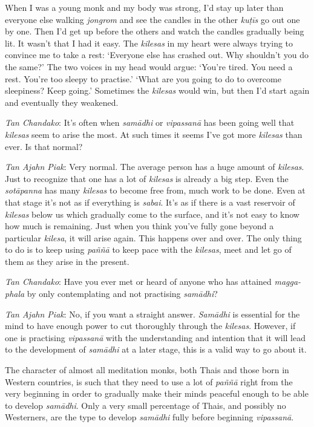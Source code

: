 When I was a young monk and my body was strong, I'd stay up later than
everyone else walking \emph{jongrom} and see the candles in the other
\emph{kuṭīs} go out one by one. Then I'd get up before the others and
watch the candles gradually being lit. It wasn't that I had it easy. The
\emph{kilesas} in my heart were always trying to convince me to take a
rest: `Everyone else has crashed out. Why shouldn't you do the same?'
The two voices in my head would argue: `You're tired. You need a rest. 
You're too sleepy to practise.' `What are you going to do to overcome
sleepiness? Keep going.' Sometimes the \emph{kilesas} would win, but
then I'd start again and eventually they weakened. 

\emph{Tan Chandako}: It's often when \emph{samādhi} or \emph{vipassanā}
has been going well that \emph{kilesas} seem to arise the most. At such
times it seems I've got more \emph{kilesas} than ever. Is that normal? 

\emph{Tan Ajahn Piak}: Very normal. The average person has a huge amount
of \emph{kilesas}. Just to recognize that one has a lot of
\emph{kilesas} is already a big step. Even the \emph{sotāpanna} has many
\emph{kilesas} to become free from, much work to be done. Even at that
stage it's not as if everything is \emph{sabai}. It's as if there is a
vast reservoir of \emph{kilesas} below us which gradually come to the
surface, and it's not easy to know how much is remaining. Just when you
think you've fully gone beyond a particular \emph{kilesa}, it will arise
again. This happens over and over. The only thing to do is to keep using
\emph{paññā} to keep pace with the \emph{kilesas}, meet and let go of
them as they arise in the present. 

\emph{Tan Chandako}: Have you ever met or heard of anyone who has
attained \emph{magga-phala} by only contemplating and not practising
\emph{samādhi}? 

\emph{Tan Ajahn Piak}: No, if you want a straight answer. \emph{Samādhi}
is essential for the mind to have enough power to cut thoroughly through
the \emph{kilesas}. However, if one is practising \emph{vipassanā} with
the understanding and intention that it will lead to the development of
\emph{samādhi} at a later stage, this is a valid way to go about it. 

The character of almost all meditation monks, both Thais and those born
in Western countries, is such that they need to use a lot of
\emph{paññā} right from the very beginning in order to gradually make
their minds peaceful enough to be able to develop \emph{samādhi}. Only a
very small percentage of Thais, and possibly no Westerners, are the type
to develop \emph{samādhi} fully before beginning \emph{vipassanā}. 

